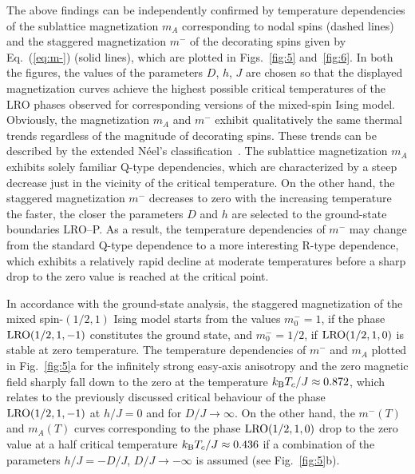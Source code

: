 \documentclass[final,5p,times,sort&compress]{elsarticle}
\begin{document}
The above findings can be independently confirmed by temperature dependencies of the sublattice magnetization $m_A$ corresponding to nodal spins (dashed lines) and the staggered magnetization $m^{-}$ of the decorating spins given by Eq.~(\ref{eq:m-}) (solid lines), which are plotted in Figs.~\ref{fig:5} and~\ref{fig:6}. In both the figures, the values of the parameters $D$, $h$, $J$ are chosen so that the displayed magnetization curves achieve the highest possible critical temperatures of the LRO phases observed for corresponding versions of the mixed-spin Ising model. Obviously, the magnetization $m_A$ and $m^{-}$ exhibit qualitatively the same thermal trends regardless of the magnitude of decorating spins. These trends can be described by the extended N\'eel's classification~\cite{Nee48,Chi97,Str06}. The sublattice magnetization $m_A$ exhibits solely familiar Q-type dependencies, which are characterized by a steep decrease just in the vicinity of the critical temperature. On the other hand, the staggered magnetization $m^{-}$ decreases to zero with the increasing temperature the faster, the closer the parameters $D$ and $h$ are selected to the ground-state boundaries LRO--P. As a result, the temperature dependencies of $m^{-}$ may change from the standard Q-type dependence to a more interesting R-type dependence, which exhibits a relatively rapid decline at moderate temperatures before a sharp drop to the zero value is reached at the critical point.

In accordance with the ground-state analysis, the staggered magnetization of the mixed spin-$(1/2,1)$ Ising model starts from the values $m^{-}_{0} = 1$, if the phase ${\rm LRO}(1/2, 1, -1)$ constitutes the ground state, and $m^{-}_{0} = 1/2$, if ${\rm LRO}(1/2, 1, 0)$ is stable at zero temperature. The temperature dependencies of $m^{-}$ and $m_A$ plotted in Fig.~\ref{fig:5}a for the infinitely strong easy-axis anisotropy and the zero magnetic field sharply fall down to the zero at the temperature $k_{\rm B}T_c/J \approx 0.872$, which relates to the previously discussed critical behaviour of the phase ${\rm LRO}(1/2, 1, -1)$ at $h/J=0$ and for $D/J\to\infty$. On the other hand, the $m^{-}(T)$ and $m_A(T)$ curves corresponding to the phase ${\rm LRO}(1/2, 1, 0)$ drop to the zero value at a half critical temperature $k_{\rm B}T_c/J \approx 0.436$ if a combination of the parameters $h/J = -D/J$, $D/J \to-\infty$ is assumed (see Fig.~\ref{fig:5}b).
\end{document}
